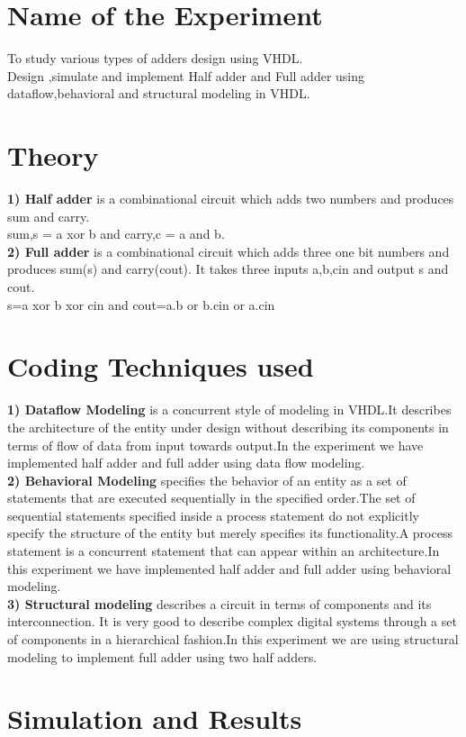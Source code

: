 \section{Name of the Experiment}
 To study various types of adders design using VHDL.\\
 Design ,simulate and implement Half adder and Full adder using 
 dataflow,behavioral
 and structural modeling in VHDL.
 

\section{Theory}
\textbf{1) Half adder} is a combinational circuit which adds two numbers and produces
sum and carry. \\
sum,s = a xor b and carry,c = a and b.\\
\textbf{2) Full adder} is a combinational circuit which adds three one bit numbers
and produces sum(s) and carry(cout).
It takes three inputs a,b,cin and output s and cout.\\
s=a xor b xor cin and cout=a.b or b.cin or a.cin

\section{Coding Techniques used}
\textbf{1) Dataflow Modeling} is a concurrent style of modeling in VHDL.It describes the architecture of the entity under design without describing its components in terms of flow of data from input towards output.In the experiment we have implemented half adder and full adder using data flow modeling.\\
\textbf{2) Behavioral Modeling} specifies the behavior of an entity as a set of statements that are executed sequentially in the specified order.The set of sequential statements specified inside a process statement do not explicitly specify the structure of the entity but merely specifies its functionality.A process statement is a concurrent statement that can appear within an architecture.In this experiment we have implemented half adder and full adder using behavioral modeling.\\
\textbf{3) Structural modeling} describes a circuit in terms of components and its interconnection. It is very good to describe complex digital systems through a set of components in a hierarchical fashion.In this experiment we are using structural modeling to implement full adder using two half adders.

\section{Simulation and Results}
